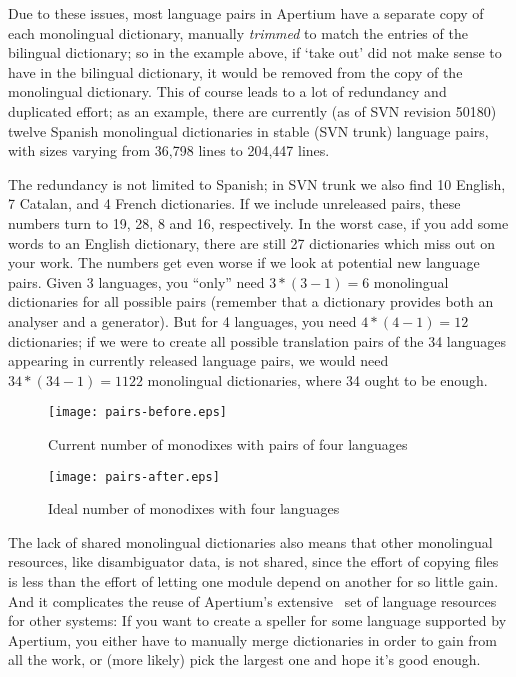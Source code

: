 \documentclass[10pt, a4paper]{article}
\newcommand{\f}[1]{`#1'}
\begin{document}
Due to these issues, most language pairs in Apertium have a separate
copy of each monolingual dictionary, manually \emph{trimmed} to match
the entries of the bilingual dictionary; so in the example above, if
\f{take out} did not make sense to have in the bilingual dictionary,
it would be removed from the copy of the monolingual dictionary. This
of course leads to a lot of redundancy and duplicated effort; as an
example, there are currently (as of SVN revision 50180) twelve Spanish
monolingual dictionaries in stable (SVN trunk) language pairs, with
sizes varying from 36,798 lines to 204,447 lines.

The redundancy is not limited to Spanish; in SVN trunk we also find 10
English, 7 Catalan, and 4 French dictionaries. If we include
unreleased pairs, these numbers turn to 19, 28, 8 and 16,
respectively.
In the worst case, if you add some words to an English dictionary,
there are still 27 dictionaries which miss out on your work.  The
numbers get even worse if we look at potential new language pairs.
Given 3 languages, you ``only'' need $3*(3-1)=6$ monolingual
dictionaries for all possible pairs (remember that a dictionary
provides both an analyser and a generator). But for 4 languages, you
need $4*(4-1)=12$ dictionaries; if we were to  create all possible
translation pairs of the 34 languages appearing in currently released
language pairs, we would need $34*(34-1)=1122$ monolingual dictionaries,
where 34 ought to be enough.

\begin{figure}[h]
  \begin{center}
    \texttt{[image: pairs-before.eps]}
    \caption{Current number of monodixes with pairs of four languages}
    \label{fig:monodixes-current}
  \end{center}
\end{figure}

\begin{figure}[h]
  \begin{center}
    \texttt{[image: pairs-after.eps]}
    \caption{Ideal number of monodixes with four languages}
    \label{fig:monodixes-ideally}
  \end{center}
\end{figure}

The lack of shared monolingual dictionaries also means that other
monolingual resources, like disambiguator data, is not shared, since
the effort of copying files is less than the effort of letting one
module depend on another for so little gain. And it complicates the reuse
of Apertium's extensive~\cite{tyers2010fosresources} set of language
resources for other systems: If you want to create a speller for some
language supported by Apertium, you either have to manually merge
dictionaries in order to gain from all the work, or (more likely) pick
the largest one and hope it's good enough.
\end{document}
